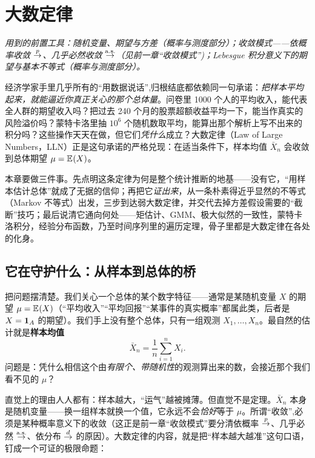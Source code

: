 \chapter{大数定律}
\label{ch:lln}

\noindent\emph{用到的前置工具：随机变量、期望与方差（概率与测度部分）；收敛模式——依概率收敛 $\overset{p}{\to}$、几乎必然收敛 $\overset{\mathrm{a.s.}}{\to}$（见前一章``收敛模式'')；Lebesgue 积分意义下的期望与基本不等式（概率与测度部分）。}
\medskip

经济学家手里几乎所有的``用数据说话'',归根结底都依赖同一句承诺：\emph{把样本平均起来，就能逼近你真正关心的那个总体量}。问卷里 1000 个人的平均收入，能代表全人群的期望收入吗？把过去 240 个月的股票超额收益平均一下，能当作真实的风险溢价吗？蒙特卡洛里抽 $10^6$ 个随机数取平均，能算出那个解析上写不出来的积分吗？这些操作天天在做，但它们\emph{凭什么}成立？大数定律（Law of Large Numbers，LLN）正是这句承诺的严格兑现：在适当条件下，样本均值 $\bar X_n$ 会收敛到总体期望 $\mu=\mathbb{E}_{}\!\left(X\right)$。

本章要做三件事。先点明这条定律为何是整个统计推断的地基——没有它，``用样本估计总体''就成了无据的信仰；再把它\emph{证出来}，从一条朴素得近乎显然的不等式（Markov 不等式）出发，三步到达弱大数定律，并交代去掉方差假设需要的``截断''技巧；最后说清它通向何处——矩估计、GMM、极大似然的一致性，蒙特卡洛积分，经验分布函数，乃至时间序列里的遍历定理，骨子里都是大数定律在各处的化身。

\section{它在守护什么：从样本到总体的桥}
\label{sec:lln-motivation}

把问题摆清楚。我们关心一个总体的某个数字特征——通常是某随机变量 $X$ 的期望 $\mu=\mathbb{E}_{}\!\left(X\right)$（``平均收入''``平均回报''``某事件的真实概率''都属此类，后者是 $X=\mathbf{1}_A$ 的期望）。我们手上没有整个总体，只有一组观测 $X_1,\dots,X_n$。最自然的估计就是\textbf{样本均值}
\[
    \bar X_n=\frac1n\sum_{i=1}^n X_i .
\]
问题是：凭什么相信这个由\emph{有限个、带随机性}的观测算出来的数，会接近那个我们看不见的 $\mu$？

直觉上的理由人人都有：样本越大，``运气''越被摊薄。但直觉不是定理。$\bar X_n$ 本身是随机变量——换一组样本就换一个值，它永远不会\emph{恰好}等于 $\mu$。所谓``收敛'',必须是某种概率意义下的收敛（这正是前一章``收敛模式''要分清依概率 $\overset{p}{\to}$、几乎必然 $\overset{\mathrm{a.s.}}{\to}$、依分布 $\overset{d}{\to}$ 的原因）。大数定律的内容，就是把``样本越大越准''这句口语，钉成一个可证的极限命题：


